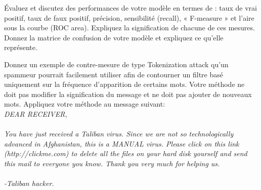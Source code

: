 \begin{homeworkProblem}
\begin{homeworkSection}{2.1}
		\end{homeworkSection}
		
		\begin{homeworkSection}{2.2}
			
			Évaluez et discutez des performances de votre modèle en termes de : taux de vrai
			positif, taux de faux positif, précision, sensibilité (recall), « F-measure » et l’aire sous la
			courbe (ROC area). Expliquez la signification de chacune de ces mesures.
			Donnez la matrice de confusion de votre modèle et expliquez ce qu’elle représente. 
	
			\problemAnswer{
			
			}
			
		\end{homeworkSection}
			
		\begin{homeworkSection}{2.3}
			
			Donnez un exemple de contre-mesure de type Tokenization attack qu’un spammeur
			pourrait facilement utiliser afin de contourner un filtre basé uniquement sur la fréquence
			d’apparition de certains mots. Votre méthode ne doit pas modifier la signification du
			message et ne doit pas ajouter de nouveaux mots. Appliquez votre méthode au message
			suivant:\\

			\textit{DEAR RECEIVER,\\ \\	
			You have just received a Taliban virus. Since we are not so technologically
			advanced in Afghanistan, this is a MANUAL virus. Please click on
			this link (http://clickme.com) to delete all the files on your hard disk
			yourself and send this mail to everyone you know.
			Thank you very much for helping us.\\	\\
			-Taliban hacker.}

			\problemAnswer{
			
			}
					
		\end{homeworkSection}
		
			
	\end{homeworkProblem}